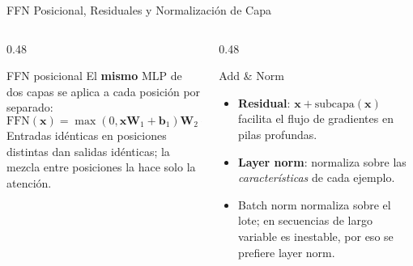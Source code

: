 \documentclass[aspectratio=169, 10pt]{beamer}
\begin{document}
\begin{frame}{FFN Posicional, Residuales y Normalizaci\'on de Capa}
	\begin{columns}[T]
		\begin{column}{0.48\textwidth}
			\begin{block}{FFN posicional}
				\small
				El \textbf{mismo} MLP de dos capas se aplica a cada posici\'on por separado:
				\[
				\mathrm{FFN}(\mathbf{x})=\max(0,\mathbf{x}\mathbf{W}_1+\mathbf{b}_1)\mathbf{W}_2+\mathbf{b}_2
				\]
				Entradas id\'enticas en posiciones distintas dan salidas id\'enticas; la mezcla entre posiciones la hace solo la atenci\'on.
			\end{block}
		\end{column}
		\begin{column}{0.48\textwidth}
			\begin{block}{Add \& Norm}
				\small
				\begin{itemize}
					\item \textbf{Residual}: $\mathbf{x}+\text{subcapa}(\mathbf{x})$ facilita el flujo de gradientes en pilas profundas.
					\item \textbf{Layer norm}: normaliza sobre las \emph{caracter\'isticas} de cada ejemplo.
					\item Batch norm normaliza sobre el lote; en secuencias de largo variable es inestable, por eso se prefiere layer norm.
				\end{itemize}
			\end{block}
		\end{column}
	\end{columns}
\end{frame}
\end{document}
